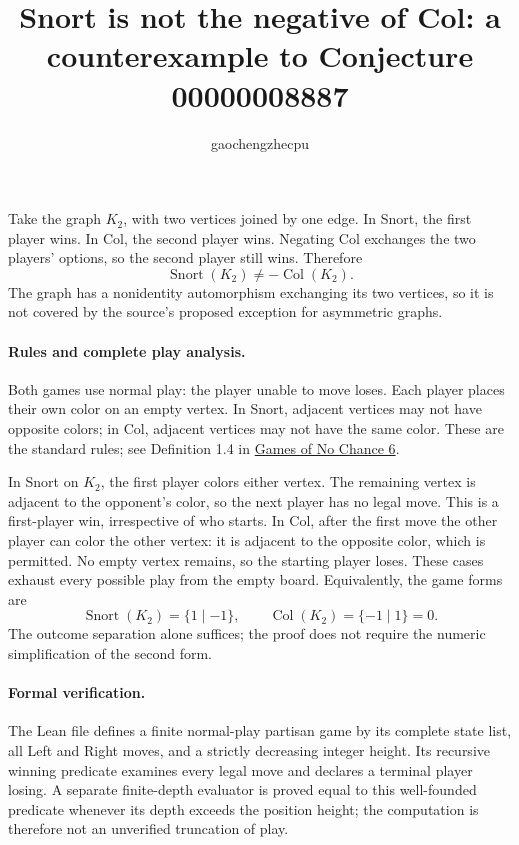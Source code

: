 \documentclass[10pt]{article}
\title{Snort is not the negative of Col: a counterexample to Conjecture 00000008887}
\author{gaochengzhecpu}
\date{}
\begin{document}
\maketitle

Take the graph $K_2$, with two vertices joined by one edge. In Snort, the
first player wins. In Col, the second player wins. Negating Col exchanges
the two players' options, so the second player still wins. Therefore
\[\operatorname{Snort}(K_2)\ne-\operatorname{Col}(K_2).\]
The graph has a nonidentity automorphism exchanging its two vertices, so
it is not covered by the source's proposed exception for asymmetric graphs.

\paragraph{Rules and complete play analysis.}
Both games use normal play: the player unable to move loses. Each player
places their own color on an empty vertex. In Snort, adjacent vertices may
not have opposite colors; in Col, adjacent vertices may not have the same
color. These are the standard rules; see Definition 1.4 in
\href{https://library.slmath.org/books/Book71/files/GONC6-18.pdf}{Games of No Chance 6}.

In Snort on $K_2$, the first player colors either vertex. The remaining
vertex is adjacent to the opponent's color, so the next player has no
legal move. This is a first-player win, irrespective of who starts.
In Col, after the first move the other player can color the other vertex:
it is adjacent to the opposite color, which is permitted. No empty vertex
remains, so the starting player loses. These cases exhaust every possible
play from the empty board. Equivalently, the game forms are
\[\operatorname{Snort}(K_2)=\{1\mid-1\},\qquad
  \operatorname{Col}(K_2)=\{-1\mid1\}=0.\]
The outcome separation alone suffices; the proof does not require the
numeric simplification of the second form.

\paragraph{Formal verification.}
The Lean file defines a finite normal-play partisan game by its complete
state list, all Left and Right moves, and a strictly decreasing integer
height. Its recursive winning predicate examines every legal move and
declares a terminal player losing. A separate finite-depth evaluator is
proved equal to this well-founded predicate whenever its depth exceeds
the position height; the computation is therefore not an unverified
truncation of play.
\end{document}

